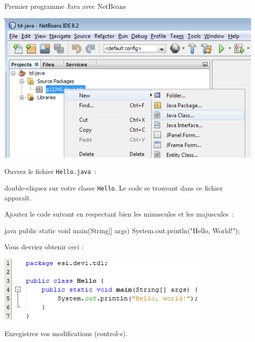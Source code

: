 \documentclass[a4paper,11pt]{style-esi/td}
\begin{document}
\begin{Tutoriel}{Premier programme Java avec NetBeans}
\begin{steps}
		\bigskip

		\begin{center}
			\includegraphics[width=.9\textwidth]{images/nb_newproject_new_class}
		\end{center}


		\item Ouvrez le fichier \texttt{Hello.java}~:

		double-cliquez sur votre classe \texttt{Hello}.
		Le code se trouvant dans ce fichier apparaît.


		Ajoutez le code suivant en respectant bien les
		minuscules et les majuscules~:

		\begin{Code}{java}
			public static void main(String[] args) {
					System.out.println("Hello, World!");
				}
		\end{Code}

		Vous devriez obtenir ceci :

		\begin{center}
			\includegraphics{images/nb_newproject_code}
		\end{center}
		Enregistrez vos modifications (control-s).


\end{steps}
\end{Tutoriel}
\end{document}
